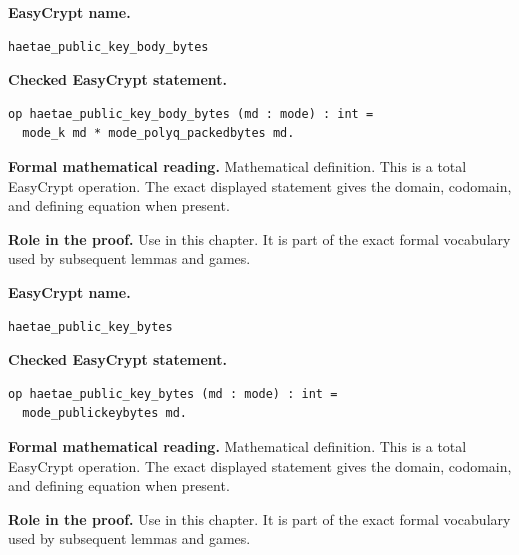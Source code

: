 \begin{formaldefinition}
\noindent\textbf{EasyCrypt name.}
\begin{lstlisting}[language=EasyCrypt,basicstyle=\ttfamily\scriptsize]
haetae_public_key_body_bytes
\end{lstlisting}
\noindent\textbf{Checked EasyCrypt statement.}
\begin{lstlisting}[language=EasyCrypt,basicstyle=\ttfamily\scriptsize]
op haetae_public_key_body_bytes (md : mode) : int =
  mode_k md * mode_polyq_packedbytes md.
\end{lstlisting}
\noindent\textbf{Formal mathematical reading.}
Mathematical definition. This is a total EasyCrypt operation.  The exact displayed statement gives the domain, codomain, and defining equation when present.

\noindent\textbf{Role in the proof.}
Use in this chapter. It is part of the exact formal vocabulary used by subsequent lemmas and games.

\end{formaldefinition}

\begin{formaldefinition}
\noindent\textbf{EasyCrypt name.}
\begin{lstlisting}[language=EasyCrypt,basicstyle=\ttfamily\scriptsize]
haetae_public_key_bytes
\end{lstlisting}
\noindent\textbf{Checked EasyCrypt statement.}
\begin{lstlisting}[language=EasyCrypt,basicstyle=\ttfamily\scriptsize]
op haetae_public_key_bytes (md : mode) : int =
  mode_publickeybytes md.
\end{lstlisting}
\noindent\textbf{Formal mathematical reading.}
Mathematical definition. This is a total EasyCrypt operation.  The exact displayed statement gives the domain, codomain, and defining equation when present.

\noindent\textbf{Role in the proof.}
Use in this chapter. It is part of the exact formal vocabulary used by subsequent lemmas and games.

\end{formaldefinition}

